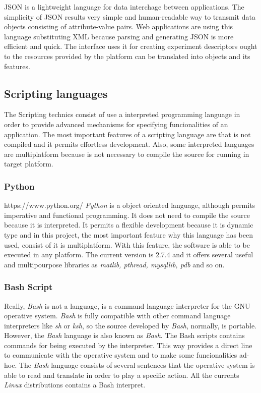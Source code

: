 \ac{JSON} is a lightweight language for data interchage between applications. The
simplicity of \ac{JSON} results very simple and human-readable way to transmit data
objects consisting of attribute-value pairs. Web applications are using this
language substituting \ac{XML} because parsing and generating \ac{JSON} is more efficient
and quick. The \bonfire interface uses it for creating experiment descriptors
ought to the resources provided by the platform can be translated into objects
and its features.

\subsection{Scripting languages}

The Scripting technics consist of use a interpreted programming language in
order to provide advanced mechanisms for specifying funcionalities of an
application. The most important features of a scripting language are that is not
compiled and it permits effortless development. Also, some interpreted languages
are multiplatform because is not necessary to compile the source for running in
target platform. 


\subsubsection{Python}
https://www.python.org/
\emph{Python} is a object oriented language, although permits imperative and functional
programming. It does not need to compile the source because it is
interpreted. It permits a flexible development because it is dynamic type and in
this project, the most important feature why this language has been used,
consist of it is multiplatform. With this feature, the software is able to be
executed in any platform. The current version is 2.7.4 and it offers several
useful and multipourpose libraries as \emph{matlib, pthread, mysqllib, pdb} and so on.

\subsubsection{Bash Script}

Really, \emph{Bash} is not a language, is a command language interpreter for the \ac{GNU}
operative system. \emph{Bash} is fully compatible with other command language
interpreters like \emph{sh} or \emph{ksh}, so the source developed by \emph{Bash}, normally, is
portable. 
However, the \emph{Bash} language is also known as \emph{Bash}. The Bash scripts contains
commands for being executed by the interpreter. This way provides a direct line
to communicate with the operative system and to make some funcionalities ad-hoc.
The \emph{Bash} language consists of several sentences that the operative system is
able to read and translate in order to play a specific action. All the currents
\emph{Linux} distributions contains a Bash interpret. 

